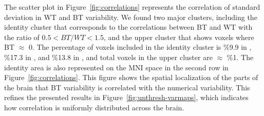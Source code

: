 \documentclass[conference]{IEEEtran}
\begin{document}
\begin{figure}[b]
  \end{figure}
  

The scatter plot in Figure~\ref{fig:correlations} represents the correlation of standard deviation in WT and BT variability.
We found two major clusters, including the identity cluster that corresponds to the correlations
between BT and WT with the ratio of $0.5 < BT/WT < 1.5$,
and the upper cluster that shows voxels where BT $\approx$ 0.
The percentage of voxels included in the identity cluster is \%9.9 in \fslspm, \%17.3 in \fslafni, and \%13.8 in \afnispm,
and total voxels in the upper cluster are $\approx$ \%1.
The identity area is also represented on the MNI space in the second row in Figure~\ref{fig:correlations}.
This figure shows the spatial localization of the parts of the brain that BT variability is correlated with the numerical variability.
This refines the presented results in Figure~\ref{fig:unthresh-varmaps},
which indicates how correlation is uniformly distributed across the brain.
  
\end{document}
